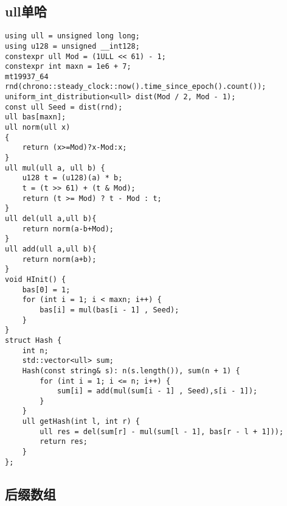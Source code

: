 \documentclass[a4paper,10pt]{article}
\begin{document}
\subsection{ull单哈}
\thispagestyle{fancy}

\noindent\begin{lstlisting}
using ull = unsigned long long;
using u128 = unsigned __int128;
constexpr ull Mod = (1ULL << 61) - 1;
constexpr int maxn = 1e6 + 7;
mt19937_64 rnd(chrono::steady_clock::now().time_since_epoch().count());
uniform_int_distribution<ull> dist(Mod / 2, Mod - 1);
const ull Seed = dist(rnd);
ull bas[maxn];
ull norm(ull x)
{
    return (x>=Mod)?x-Mod:x;
}
ull mul(ull a, ull b) {
    u128 t = (u128)(a) * b;
    t = (t >> 61) + (t & Mod);
    return (t >= Mod) ? t - Mod : t;
}
ull del(ull a,ull b){
    return norm(a-b+Mod);
}
ull add(ull a,ull b){
    return norm(a+b);
}
void HInit() {
    bas[0] = 1;
    for (int i = 1; i < maxn; i++) {
        bas[i] = mul(bas[i - 1] , Seed);
    }
}
struct Hash {
    int n;
    std::vector<ull> sum;
    Hash(const string& s): n(s.length()), sum(n + 1) {
        for (int i = 1; i <= n; i++) {
            sum[i] = add(mul(sum[i - 1] , Seed),s[i - 1]);
        }
    }
    ull getHash(int l, int r) {
        ull res = del(sum[r] - mul(sum[l - 1], bas[r - l + 1]));
        return res;
    }
};\end{lstlisting}

\subsection{后缀数组}
\thispagestyle{fancy}
\end{document}
